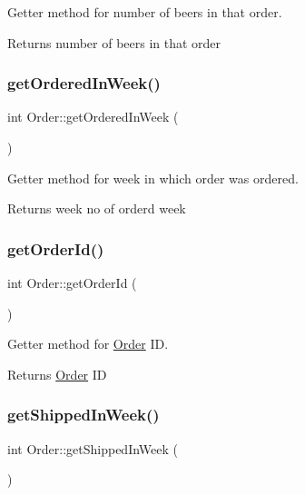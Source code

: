 Getter method for number of beers in that order. 

\begin{DoxyReturn}{Returns}
number of beers in that order 
\end{DoxyReturn}
\mbox{\label{class_order_aed0ea4435169c95ecc05530df91f225a}} 
\subsubsection{\texorpdfstring{get\+Ordered\+In\+Week()}{getOrderedInWeek()}}
{\footnotesize\ttfamily int Order\+::get\+Ordered\+In\+Week (\begin{DoxyParamCaption}{ }\end{DoxyParamCaption})}



Getter method for week in which order was ordered. 

\begin{DoxyReturn}{Returns}
week no of orderd week 
\end{DoxyReturn}
\mbox{\label{class_order_aa5042da754f07b1876aa63615c5f2983}} 
\subsubsection{\texorpdfstring{get\+Order\+Id()}{getOrderId()}}
{\footnotesize\ttfamily int Order\+::get\+Order\+Id (\begin{DoxyParamCaption}{ }\end{DoxyParamCaption})}



Getter method for \hyperlink{class_order}{Order} ID. 

\begin{DoxyReturn}{Returns}
\hyperlink{class_order}{Order} ID 
\end{DoxyReturn}
\mbox{\label{class_order_a7103f60141cf2fefd053aac011dc7613}} 
\subsubsection{\texorpdfstring{get\+Shipped\+In\+Week()}{getShippedInWeek()}}
{\footnotesize\ttfamily int Order\+::get\+Shipped\+In\+Week (\begin{DoxyParamCaption}{ }\end{DoxyParamCaption})}



